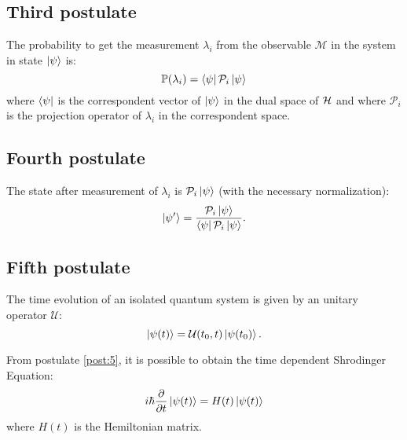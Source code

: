     \subsection{Third postulate}
    \begin{postulate}
        The probability to get the measurement $\lambda_i$ from the observable 
        $\mathcal{M}$ in the system in state $\ket{\psi}$ is:
        \begin{equation*}
            \mathbb{P}(\lambda_i)=\bra{\psi}\mathcal{P}_i\ket{\psi}
        \end{equation*}
        where $\bra{\psi}$ is the correspondent vector of $\ket{\psi}$ in the 
        dual space of $\mathcal{H}$ and where $\mathcal{P}_i$ is the projection operator
        of $\lambda_i$ in the correspondent space.
        \label{post:3}
    \end{postulate}

    \subsection{Fourth postulate}
    \begin{postulate}
        The state after measurement of $\lambda_i$ is $\mathcal{P}_i\ket{\psi}$ (with the
        necessary normalization):
        \begin{equation*}
            \ket{\psi'}=\frac{\mathcal{P}_i\ket{\psi}}{\bra{\psi}\mathcal{P}_i\ket{\psi}}.
        \end{equation*}
        \label{post:4}
    \end{postulate}

    \subsection{Fifth postulate}
    \begin{postulate}
        The time evolution of an isolated quantum system is given by an unitary operator
        $\mathcal{U}$:
        \begin{equation*}
            \ket{\psi(t)}=\mathcal{U}(t_0,t)\ket{\psi(t_0)}.
        \end{equation*}
        \label{post:5}
    \end{postulate}
    \begin{observation*}
        From postulate \ref{post:5}, it is possible to obtain the time dependent Shrodinger Equation:
        \begin{equation*}
            i\hbar\partialderivative{}{t}\ket{\psi(t)}=H(t)\ket{\psi(t)}
        \end{equation*}
        where $H(t)$ is the Hemiltonian matrix.
    \end{observation*}

